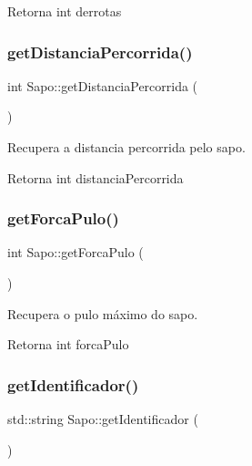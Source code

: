 \begin{DoxyReturn}{Retorna}
int derrotas 
\end{DoxyReturn}
\mbox{\label{classSapo_a41a99439aacf25a65c60622eb7e65f60}} 
\subsubsection{\texorpdfstring{get\+Distancia\+Percorrida()}{getDistanciaPercorrida()}}
{\footnotesize\ttfamily int Sapo\+::get\+Distancia\+Percorrida (\begin{DoxyParamCaption}{ }\end{DoxyParamCaption})}



Recupera a distancia percorrida pelo sapo. 

\begin{DoxyReturn}{Retorna}
int distancia\+Percorrida 
\end{DoxyReturn}
\mbox{\label{classSapo_ac6225c3632a30877068c9b2bc50e6ed1}} 
\subsubsection{\texorpdfstring{get\+Forca\+Pulo()}{getForcaPulo()}}
{\footnotesize\ttfamily int Sapo\+::get\+Forca\+Pulo (\begin{DoxyParamCaption}{ }\end{DoxyParamCaption})}



Recupera o pulo máximo do sapo. 

\begin{DoxyReturn}{Retorna}
int forca\+Pulo 
\end{DoxyReturn}
\mbox{\label{classSapo_a1a9022f5e4a1f561454650b5c99baa3e}} 
\subsubsection{\texorpdfstring{get\+Identificador()}{getIdentificador()}}
{\footnotesize\ttfamily std\+::string Sapo\+::get\+Identificador (\begin{DoxyParamCaption}{ }\end{DoxyParamCaption})}



